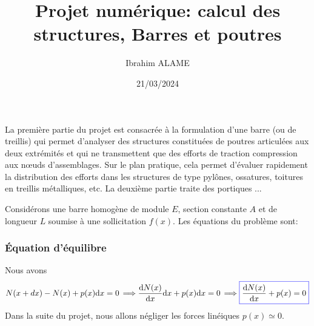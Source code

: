 \documentclass[a4paper]{article}
\title{Projet numérique: calcul des structures, Barres et poutres}
\author{Ibrahim ALAME}
\date{21/03/2024}
\def \de {{\rm d}}
\newcommand{\myredbox}[1]{\fcolorbox{blue}{white}{$\displaystyle#1$}}
\begin{document}
\maketitle

La  première partie du projet est consacrée à la formulation d'une barre (ou de treillis) qui permet d'analyser des structures constituées de poutres articulées aux deux extrémités  et qui ne transmettent que des efforts de traction compression aux nœuds d'assemblages. Sur le plan pratique, cela permet d'évaluer rapidement la distribution des efforts dans les structures de type pylônes, ossatures, toitures en treillis métalliques, etc.
La deuxième partie traite des portiques ...

Considérons une barre homogène de module $E$, section constante $A$ et de longueur $L$ soumise à une sollicitation $f(x)$. Les équations du problème sont:
\subsubsection*{Équation d'équilibre}

\begin{center}

\end{center}

Nous avons
\[N(x+dx)-N(x)+p(x)\de x=0\, \Longrightarrow \frac{\de N(x)}{\de x}\de x+p(x)\de x=0\, \Longrightarrow \myredbox{\frac{\de N(x)}{\de x}+p(x)=0}\]
Dans la suite du projet, nous allons négliger les forces linéiques $p(x)\simeq 0$.
\end{document}
